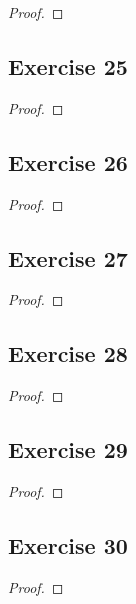 \documentclass[14pt]{extarticle}
\begin{document}
\begin{proof}

\end{proof}

\subsection{Exercise 25}

\begin{proof}

\end{proof}

\subsection{Exercise 26}

\begin{proof}

\end{proof}

\subsection{Exercise 27}

\begin{proof}

\end{proof}

\subsection{Exercise 28}

\begin{proof}

\end{proof}

\subsection{Exercise 29}

\begin{proof}

\end{proof}

\subsection{Exercise 30}

\begin{proof}

\end{proof}
\end{document}
